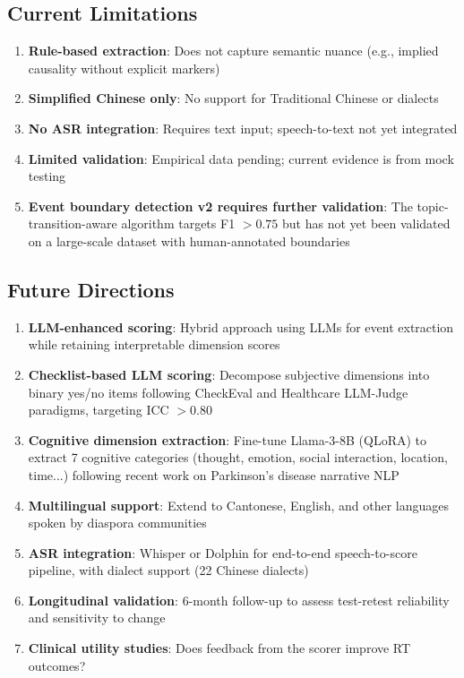 \documentclass[11pt]{article}
\begin{document}
\subsection{Current Limitations}

\begin{enumerate}[label=(\arabic*)]
    \item \textbf{Rule-based extraction}: Does not capture semantic nuance (e.g., implied causality without explicit markers)
    \item \textbf{Simplified Chinese only}: No support for Traditional Chinese or dialects
    \item \textbf{No ASR integration}: Requires text input; speech-to-text not yet integrated
    \item \textbf{Limited validation}: Empirical data pending; current evidence is from mock testing
    \item \textbf{Event boundary detection v2 requires further validation}: The topic-transition-aware algorithm targets F1 $> 0.75$ but has not yet been validated on a large-scale dataset with human-annotated boundaries
\end{enumerate}

\subsection{Future Directions}

\begin{enumerate}[label=(\arabic*)]
    \item \textbf{LLM-enhanced scoring}: Hybrid approach using LLMs for event extraction while retaining interpretable dimension scores
    \item \textbf{Checklist-based LLM scoring}: Decompose subjective dimensions into binary yes/no items following CheckEval \citep{checkeval2024} and Healthcare LLM-Judge \citep{healthcare_llm_judge2025} paradigms, targeting ICC $> 0.80$
    \item \textbf{Cognitive dimension extraction}: Fine-tune Llama-3-8B (QLoRA) to extract 7 cognitive categories (thought, emotion, social interaction, location, time...) following recent work on Parkinson's disease narrative NLP \citep{pd_narrative_nlp2025}
    \item \textbf{Multilingual support}: Extend to Cantonese, English, and other languages spoken by diaspora communities
    \item \textbf{ASR integration}: Whisper or Dolphin \citep{dolphin2025} for end-to-end speech-to-score pipeline, with dialect support (22 Chinese dialects)
    \item \textbf{Longitudinal validation}: 6-month follow-up to assess test-retest reliability and sensitivity to change
    \item \textbf{Clinical utility studies}: Does feedback from the scorer improve RT outcomes?
\end{enumerate}
\end{document}
